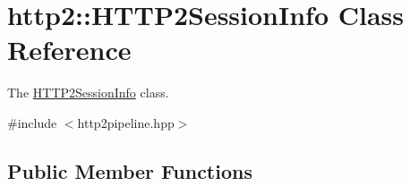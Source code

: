 \hypertarget{classhttp2_1_1HTTP2SessionInfo}{}\section{http2\+:\+:H\+T\+T\+P2\+Session\+Info Class Reference}
\label{classhttp2_1_1HTTP2SessionInfo}


The \hyperlink{classhttp2_1_1HTTP2SessionInfo}{H\+T\+T\+P2\+Session\+Info} class.  




{\ttfamily \#include $<$http2pipeline.\+hpp$>$}

\subsection*{Public Member Functions}
